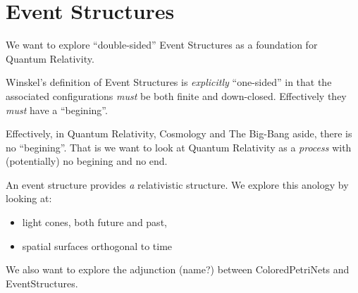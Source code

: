 
\chapter*{Event Structures}

We want to explore ``double-sided'' Event Structures as a foundation for
Quantum Relativity.

Winskel's definition of Event Structures is \emph{explicitly} ``one-sided'' in
that the associated configurations \emph{must} be both finite and down-closed.
Effectively they \emph{must} have a ``begining''.

Effectively, in Quantum Relativity, Cosmology and The Big-Bang aside, there is
no ``begining''. That is we want to look at Quantum Relativity as a
\emph{process} with (potentially) no begining and no end.

An event structure provides \emph{a} relativistic structure. We explore this
anology by looking at:

\begin{itemize}
  \item light cones, both future and past,
  \item spatial surfaces orthogonal to time
\end{itemize}

We also want to explore the adjunction (name?) between ColoredPetriNets and
EventStructures.

